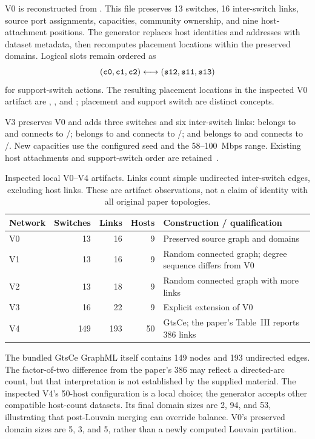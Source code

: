 \documentclass[11pt,a4paper]{article}
\newcommand{\code}[1]{\texttt{\detokenize{#1}}}
\begin{document}
V0 is reconstructed from . This file
preserves 13 switches, 16 inter-switch links, source port assignments,
capacities, community ownership, and nine host-attachment positions. The
generator replaces host identities and addresses with dataset metadata, then
recomputes placement locations within the preserved domains. Logical slots
remain ordered as
\begin{equation}
 (\text{\code{c0}},\text{\code{c1}},\text{\code{c2}})
 \longleftrightarrow
 (\text{\code{s12}},\text{\code{s11}},\text{\code{s13}})
\end{equation}
for support-switch actions. The resulting placement locations in the inspected
V0 artifact are \code{s6}, \code{s11}, and \code{s7}; placement and support
switch are distinct concepts.

V3 preserves V0 and adds three switches and six inter-switch links:
\code{s14} belongs to \code{c0} and connects to \code{s1}/\code{s6};
\code{s15} belongs to \code{c2} and connects to \code{s3}/\code{s7}; and
\code{s16} belongs to \code{c1} and connects to \code{s5}/\code{s9}.
New capacities use the configured seed and the 58--100~Mbps range.
Existing host attachments and support-switch order are retained~\cite{code-network}.

\begin{table}[htbp]
\centering\small
\caption{Inspected local V0--V4 artifacts. Links count simple undirected
inter-switch edges, excluding host links. These are artifact observations,
not a claim of identity with all original paper topologies.}
\label{tab:topologies}
\begin{tabularx}{\textwidth}{@{}lrrrY@{}}
\toprule
Network & Switches & Links & Hosts & Construction / qualification \\
\midrule
V0 & 13 & 16 & 9 & Preserved source graph and domains \\
V1 & 13 & 16 & 9 & Random connected graph; degree sequence differs from V0 \\
V2 & 13 & 18 & 9 & Random connected graph with more links \\
V3 & 16 & 22 & 9 & Explicit extension of V0 \\
V4 & 149 & 193 & 50 & GtsCe; the paper's Table~III reports 386 links \\
\bottomrule
\end{tabularx}
\end{table}

The bundled GtsCe GraphML itself contains 149 nodes and 193 undirected edges.
The factor-of-two difference from the paper's 386 may reflect a directed-arc
count, but that interpretation is not established by the supplied material.
The inspected V4's 50-host configuration is a local choice; the generator
accepts other compatible host-count datasets. Its final domain sizes are
2, 94, and 53, illustrating that post-Louvain merging can override balance.
V0's preserved domain sizes are 5, 3, and 5, rather than a newly computed
Louvain partition.
\end{document}
